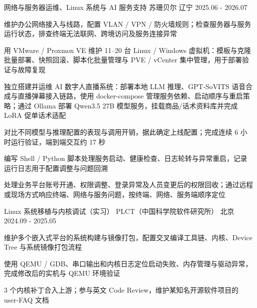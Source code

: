 
\begin{cventries}

  \cventry
    {网络与服务器运维、Linux 系统与 AI 服务支持}
    {苏珊贝尔}
    {辽宁}
    {2025.06 - 2026.07}
    {
      \begin{cvitems}
        \item {维护办公网络接入与线路，配置 VLAN / VPN / 防火墙规则；检查服务器与服务运行状态，排查终端无法联网、跨境访问及服务连接异常}
        \item {用 VMware / Proxmox VE 维护 11–20 台 Linux / Windows 虚拟机：模板与克隆批量部署、快照回滚、脚本化批量管理与 PVE / vCenter 集中管理，用于部署验证与故障复现}
        \item {独立搭建并运维 AI 数字人直播系统：部署本地 LLM 推理、GPT-SoVITS 语音合成与直播弹幕接入链路，使用 docker-compose 管理服务依赖、启动顺序与重启策略；通过 Ollama 部署 Qwen3.5 27B 模型服务，挂载商品/话术资料库并完成 LoRA 促单话术适配}
        \item {对比不同模型与推理配置的表现与调用开销，据此确定上线配置；完成连续 6 小时运行验证，端到端交互约 17 秒}
        \item {编写 Shell / Python 脚本处理服务启动、健康检查、日志轮转与异常重启，记录运行日志用于配置调整与问题回溯}
        \item {处理业务平台账号开通、权限调整、登录异常及人员变更后的权限回收；通过远程或现场方式响应终端、网络与服务问题，按终端、网络、服务端顺序定位}
      \end{cvitems}
    }

  \cventry
    {Linux 系统移植与内核调试（实习）}
    {PLCT（中国科学院软件研究所）}
    {北京}
    {2024.09 - 2025.05}
    {
      \begin{cvitems}
        \item {维护多个嵌入式平台的系统构建与镜像打包，配置交叉编译工具链、内核、Device Tree 与系统镜像打包流程}
        \item {使用 QEMU / GDB、串口输出和内核日志定位启动失败、内存管理与驱动异常，完成修改后的实机与 QEMU 环境验证}
        \item {3 个内核补丁合入上游；参与英文 Code Review，维护某知名开源软件项目的 user-FAQ 文档}
      \end{cvitems}
    }

\end{cventries}
